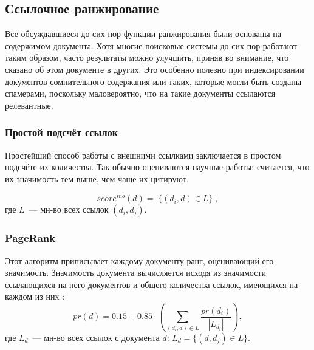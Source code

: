 \subsection{Ссылочное ранжирование}
Все обсуждавшиеся до сих пор функции ранжирования были основаны на содержимом документа. Хотя многие поисковые системы до сих пор работают таким образом, часто результаты можно улучшить, приняв во внимание, что сказано об этом документе в других. Это особенно полезно при индексировании документов сомнительного содержания или таких, которые могли быть созданы спамерами, поскольку маловероятно, что на такие документы ссылаются релевантные.


\subsubsection{Простой подсчёт ссылок}
Простейший способ работы с внешними ссылками заключается в простом подсчёте их количества. Так обычно оцениваются научные работы: считается, что их значимость тем выше, чем чаще их цитируют.

\begin{equation}
  score^{inb}(d) = \big|\{(d_i, d)\in L\}\big|,
\end{equation}
где $L$~--- мн-во всех ссылок $(d_i, d_j)$.

\subsubsection{PageRank} \label{sssec:pagerank}
Этот алгоритм приписывает каждому документу ранг, оценивающий его значимость. Значимость документа вычисляется исходя из значимости ссылающихся на него документов и общего количества ссылок, имеющихся на каждом из них \cite{segaran07}:
\begin{equation} \label{eq:pagerank}
  pr(d) = 0.15 + 0.85 \cdot \left(\sum_{(d_i, d)\in L} \frac{pr(d_i)}{|L_{d_i}|}\right),
\end{equation}
где $L_d$~--- мн-во всех ссылок с документа $d$: $L_d = \{(d, d_j)\in L\}$.

